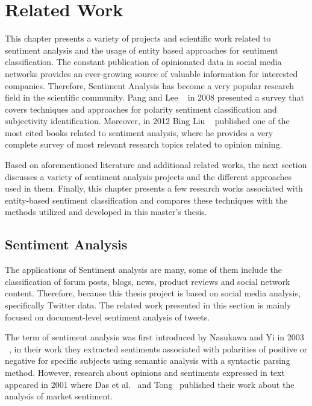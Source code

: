 
\chapter{Related Work}
\label{sec:related_work}


This chapter presents a variety of projects and scientific work related to sentiment analysis and the usage of entity based approaches for sentiment classification. The constant publication of opinionated data in social media networks provides an ever-growing source of valuable information for interested companies. Therefore, Sentiment Analysis has become a very popular research field in the scientific community. Pang and Lee ~\cite{pang2008opinion} in 2008 presented a survey that covers techniques and approaches for polarity sentiment classification and subjectivity identification. Moreover, in 2012 Bing Liu ~\cite{liu2012sentiment} published one of the most cited books related to sentiment analysis, where he provides a very complete survey of most relevant research topics related to opinion mining. 

Based on aforementioned literature and additional related works, the next section discusses a variety of sentiment analysis projects and the different approaches used in them. Finally, this chapter presents a few research works associated with entity-based sentiment classification and compares these techniques with the methods utilized and developed in this master's thesis.

\section{Sentiment Analysis}


The applications of Sentiment analysis are many, some of them include the classification of forum posts, blogs, news, product reviews and social network content. Therefore, because this thesis project is based on social media analysis, specifically Twitter data. The related work presented in this section is mainly focused on document-level sentiment analysis of tweets.

\pagebreak

The term of sentiment analysis was first introduced by Nasukawa and Yi in 2003 ~\cite{nasukawa2003sentiment}, in their work they extracted sentiments associated with polarities of positive or negative for specific subjects using semantic analysis with a syntactic parsing method. However, research about opinions and sentiments expressed in text appeared in 2001 where Das et al.~\cite{das2001yahoo} and Tong~\cite{tong2001operational} published their work about the analysis of market sentiment. 

